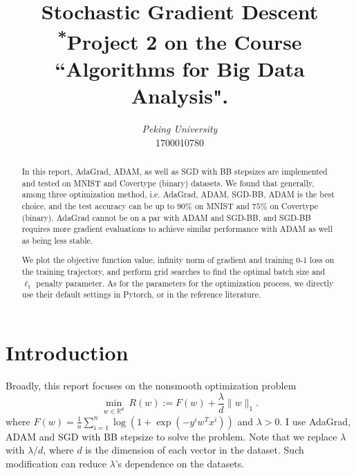 \documentclass[conference,onecolumn,12pt]{IEEEtran}
\newcommand{\R}{\mathbb{R}}
\renewcommand{\(}{\left(}
\renewcommand{\)}{\right)}
\numberwithin{equation}{section}
\numberwithin{figure}{section}
\numberwithin{table}{section}
\theoremstyle{definition}
\begin{document}
\title{Stochastic Gradient Descent\\
{\footnotesize \textsuperscript{*}Project 2 on the Course ``Algorithms for Big Data Analysis".}
}

\author{
\textit{Peking University}\\
1700010780}
\date{}

\maketitle
\thispagestyle{fancy} %
\lhead{} %
\chead{} %
\rhead{} %
\lfoot{} %
\cfoot{} %
\cfoot{\thepage} %
\renewcommand{\headrulewidth}{0pt} %
\renewcommand{\footrulewidth}{1pt} %
\pagestyle{fancy}
\cfoot{\thepage}
\begin{abstract}
In this report, AdaGrad, ADAM, as well as SGD with BB stepsizes are implemented and tested on MNIST and Covertype (binary) datasets. We found that generally, among three optimization method, i.e. AdaGrad, ADAM, SGD-BB, ADAM is the best choice, and the test accuracy can be up to $90\%$ on MNIST and $75\%$ on Covertype (binary). AdaGrad cannot be on a par with ADAM and SGD-BB, and SGD-BB requires more gradient evaluations to achieve similar performance with ADAM as well as being less stable. 

We plot the objective function value, infinity norm of gradient and training 0-1 loss on the training trajectory, and perform grid searches to find the optimal batch size and $\ell_1$ penalty parameter. As for the parameters for the optimization process, we directly use their default settings in Pytorch, or in the reference literature.
\end{abstract}
\tableofcontents
\clearpage
\section{Introduction}
Broadly, this report focuses on the nonsmooth optimization problem
\begin{equation} \label{l1prob}
  \min_{w\in\R^{d}}\ R(w) := F(w) + \frac{\lambda}{d}\| w\|_1.
\end{equation}
where $F(w) = \frac{1}{n}\sum_{i=1}^n \log(1+\exp(-y^i w^T x^i))$ and $\lambda >0$. I use AdaGrad, ADAM and SGD with BB stepsize to solve the problem. Note that we replace $\lambda$ with $\lambda/d$, where $d$ is the dimension of each vector in the dataset. Such modification can reduce $\lambda$'s dependence on the datasets.
\end{document}
